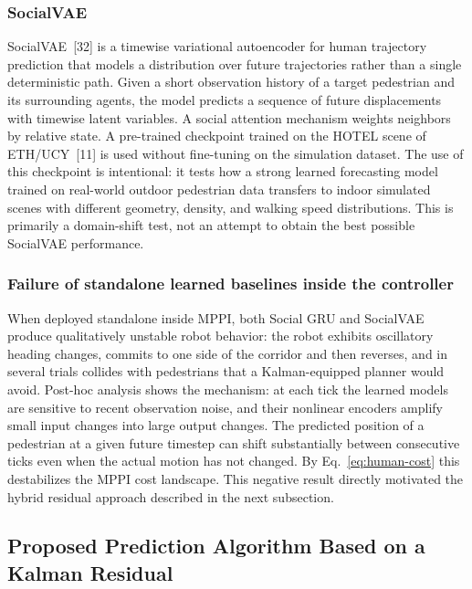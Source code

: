 \documentclass[12pt, a4paper]{article}
\begin{document}
\subsubsection{SocialVAE}

SocialVAE~[32] is a timewise variational autoencoder for human trajectory prediction that models a distribution over future trajectories rather than a single deterministic path. Given a short observation history of a target pedestrian and its surrounding agents, the model predicts a sequence of future displacements with timewise latent variables. A social attention mechanism weights neighbors by relative state. A pre-trained checkpoint trained on the HOTEL scene of ETH/UCY~[11] is used without fine-tuning on the simulation dataset. The use of this checkpoint is intentional: it tests how a strong learned forecasting model trained on real-world outdoor pedestrian data transfers to indoor simulated scenes with different geometry, density, and walking speed distributions. This is primarily a domain-shift test, not an attempt to obtain the best possible SocialVAE performance.

\subsubsection{Failure of standalone learned baselines inside the controller}

When deployed standalone inside MPPI, both Social GRU and SocialVAE produce qualitatively unstable robot behavior: the robot exhibits oscillatory heading changes, commits to one side of the corridor and then reverses, and in several trials collides with pedestrians that a Kalman-equipped planner would avoid. Post-hoc analysis shows the mechanism: at each tick the learned models are sensitive to recent observation noise, and their nonlinear encoders amplify small input changes into large output changes. The predicted position of a pedestrian at a given future timestep can shift substantially between consecutive ticks even when the actual motion has not changed. By Eq.~\eqref{eq:human-cost} this destabilizes the MPPI cost landscape. This negative result directly motivated the hybrid residual approach described in the next subsection.

\subsection{Proposed Prediction Algorithm Based on a Kalman Residual}
\label{sec:proposed}
\end{document}
